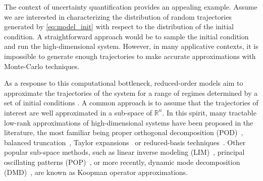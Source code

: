 \documentclass{article}
\newcommand{\Rr}{\mathds{R}}
\begin{document}
The context of uncertainty quantification provides an appealing example. Assume we are interested in characterizing the distribution of  random trajectories generated by \eqref{eq:model_init} with respect to the distribution of the initial condition. A straightforward approach would be to sample the initial condition and run the high-dimensional system. However, in many applicative contexts, it is  impossible to generate enough trajectories  to make accurate approximations with Monte-Carlo techniques.

 As a response to this computational bottleneck,  reduced-order models aim to approximate  the trajectories of the system for a range of regimes determined by a set of initial conditions \cite{2015arXiv150206797C}. 
 A common approach is to assume that the trajectories of interest are well approximated in a sub-space of $\Rr^n$. In this spirit, many  tractable low-rank approximations of  high-dimensional systems have been proposed in the literature, the most familiar  being  proper orthogonal decomposition (POD)~\cite{9780511622700}, balanced truncation~\cite{Antoulas2005Overview}, Taylor expansions~\cite{ZAMM:ZAMM19830630105} or reduced-basis techniques~\cite{Quarteroni2011Certified}.  Other popular sub-space methods,  such as  linear inverse modeling (LIM)~\cite{penland1993prediction}, principal oscillating patterns (POP)~\cite{Hasselmann88}, or more recently, dynamic mode decomposition (DMD)~\cite{Schmid10,Chen12,Jovanovic12,williams2015data,Tu2014391}, are known as Koopman operator approximations.  
 
\end{document}
